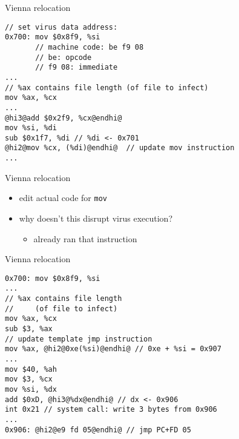\begin{frame}[fragile,label=virusReloc2]{Vienna relocation}
\begin{lstlisting}
// set virus data address:
0x700: mov $0x8f9, %si 
       // machine code: be f9 08
       // be: opcode
       // f9 08: immediate
...
// %ax contains file length (of file to infect)
mov %ax, %cx
...
@hi3@add $0x2f9, %cx@endhi@
mov %si, %di   
sub $0x1f7, %di // %di <- 0x701
@hi2@mov %cx, (%di)@endhi@  // update mov instruction
...
\end{lstlisting}
\end{frame}

\begin{frame}[fragile,label=virusReloc3]{Vienna relocation}
\begin{itemize}
\item edit actual code for {\tt mov}
\item why doesn't this disrupt virus execution?
    \begin{itemize}\item<2> already ran that instruction\end{itemize}
\end{itemize}
\end{frame}

\begin{frame}[fragile,label=virusReloc4]{Vienna relocation}
\begin{lstlisting}
0x700: mov $0x8f9, %si
...
// %ax contains file length
//     (of file to infect)
mov %ax, %cx
sub $3, %ax
// update template jmp instruction
mov %ax, @hi2@0xe(%si)@endhi@ // 0xe + %si = 0x907
...
mov $40, %ah
mov $3, %cx
mov %si, %dx  
add $0xD, @hi3@%dx@endhi@ // dx <- 0x906
int 0x21 // system call: write 3 bytes from 0x906
...
0x906: @hi2@e9 fd 05@endhi@ // jmp PC+FD 05
\end{lstlisting}
\end{frame}

